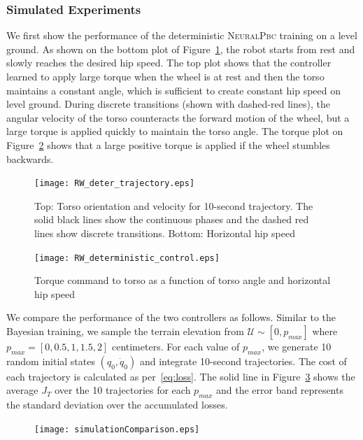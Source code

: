 \subsubsection{Simulated Experiments}

We first show the performance of the deterministic \textsc{NeuralPbc} training
on a level ground.
%
As shown on the bottom plot of Figure~\ref{fig:deter_rw_trajectory}, the robot
starts from rest and slowly reaches the desired hip speed.
%
The top plot shows that the controller learned to apply large torque
when the wheel is at rest and then the torso maintains a constant angle, which
is sufficient to create constant hip speed on level ground.  
%
During discrete transitions (shown with dashed-red lines), the angular velocity
of the torso counteracts the forward motion of the wheel, but a large torque is
applied quickly to maintain the torso angle.
%
The torque plot on Figure~\ref{fig:deter_control} shows that a large
positive torque is applied if the wheel stumbles backwards.
%

\begin{figure}[H]
    \centering
    \texttt{[image: RW\_deter\_trajectory.eps]}
    \caption{Top: Torso orientation and velocity for 10-second trajectory. The
            solid black lines show the continuous phases and the dashed red
            lines show discrete transitions. Bottom: Horizontal hip speed}
    \label{fig:deter_rw_trajectory}
\end{figure}

\begin{figure}[H]
    \centering
    \texttt{[image: RW\_deterministic\_control.eps]}
    \caption{Torque command to torso as a function of torso angle and horizontal hip speed}
    \label{fig:deter_control}
\end{figure}
We compare the performance of the two controllers as follows.
%
Similar to the Bayesian training, we sample the terrain elevation from
$\mathcal{U} \sim[0, p_{max}]$ where $p_{max} = [0, 0.5, 1, 1.5, 2]$ centimeters.
%
For each value of $p_{max}$, we generate 10 random initial states $(q_0,
\dot{q}_0)$ and integrate 10-second trajectories.
%
The cost of each trajectory is calculated as per~\eqref{eq:loss}.
%
The solid line in Figure~\ref{fig:comparison} shows the average $J_T$ over the
10 trajectories for each $p_{max}$ and the error band represents the standard
deviation over the accumulated losses.

\begin{figure}[H]
    \centering
    \texttt{[image: simulationComparison.eps]}
    \label{fig:comparison}
\end{figure}

